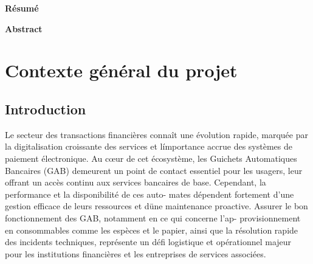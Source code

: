 \documentclass[a4paper,15pt]{report}
\begin{document}
	
	\cleardoublepage
	\thispagestyle{empty}
	\begin{center}
		\vspace*{3cm}
		{\Large \textbf{Résumé}}
	\end{center}
	

	
	\cleardoublepage
	\thispagestyle{empty}
	\begin{center}
		\vspace*{3cm}
		{\Large \textbf{Abstract}}
	\end{center}
	

	
	\cleardoublepage
	\tableofcontents
	
	\cleardoublepage
	\listoffigures
	
	\cleardoublepage
	\listoftables
	
	\cleardoublepage
	\renewcommand{\thepage}{\arabic{page}}
	
	\chapter{Contexte général du projet}
	\section{Introduction}
	\label{sec:intro}
	Le secteur des transactions financières connaît une évolution rapide, marquée par
	la digitalisation croissante des services et límportance accrue des systèmes de paiement
	électronique. Au cœur de cet écosystème, les Guichets Automatiques Bancaires (GAB)
	demeurent un point de contact essentiel pour les usagers, leur offrant un accès continu
	aux services bancaires de base. Cependant, la performance et la disponibilité de ces auto-
	mates dépendent fortement d’une gestion efficace de leurs ressources et düne maintenance
	proactive. Assurer le bon fonctionnement des GAB, notamment en ce qui concerne l’ap-
	provisionnement en consommables comme les espèces et le papier, ainsi que la résolution
	rapide des incidents techniques, représente un défi logistique et opérationnel majeur pour
	les institutions financières et les entreprises de services associées.
	
\end{document}
